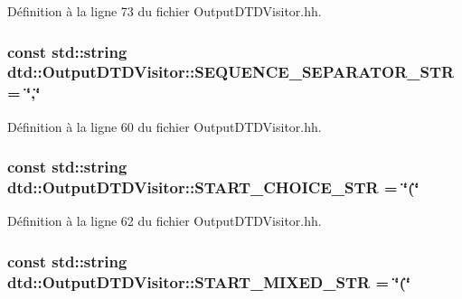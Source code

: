 Définition à la ligne 73 du fichier OutputDTDVisitor.hh.

\hypertarget{classdtd_1_1_output_d_t_d_visitor_acfffbc0db723271579d1fd87dc699b05}{
\subsubsection[{SEQUENCE\_\-SEPARATOR\_\-STR}]{\setlength{\rightskip}{0pt plus 5cm}const std::string {\bf dtd::OutputDTDVisitor::SEQUENCE\_\-SEPARATOR\_\-STR} = \char`\"{},\char`\"{}}}
\label{classdtd_1_1_output_d_t_d_visitor_acfffbc0db723271579d1fd87dc699b05}


Définition à la ligne 60 du fichier OutputDTDVisitor.hh.

\hypertarget{classdtd_1_1_output_d_t_d_visitor_ae66777110076859a443e00a9da55ff1b}{
\subsubsection[{START\_\-CHOICE\_\-STR}]{\setlength{\rightskip}{0pt plus 5cm}const std::string {\bf dtd::OutputDTDVisitor::START\_\-CHOICE\_\-STR} = \char`\"{}(\char`\"{}}}
\label{classdtd_1_1_output_d_t_d_visitor_ae66777110076859a443e00a9da55ff1b}


Définition à la ligne 62 du fichier OutputDTDVisitor.hh.

\hypertarget{classdtd_1_1_output_d_t_d_visitor_a254da51819583f6fd4501521f741042d}{
\subsubsection[{START\_\-MIXED\_\-STR}]{\setlength{\rightskip}{0pt plus 5cm}const std::string {\bf dtd::OutputDTDVisitor::START\_\-MIXED\_\-STR} = \char`\"{}(\char`\"{}}}
\label{classdtd_1_1_output_d_t_d_visitor_a254da51819583f6fd4501521f741042d}


